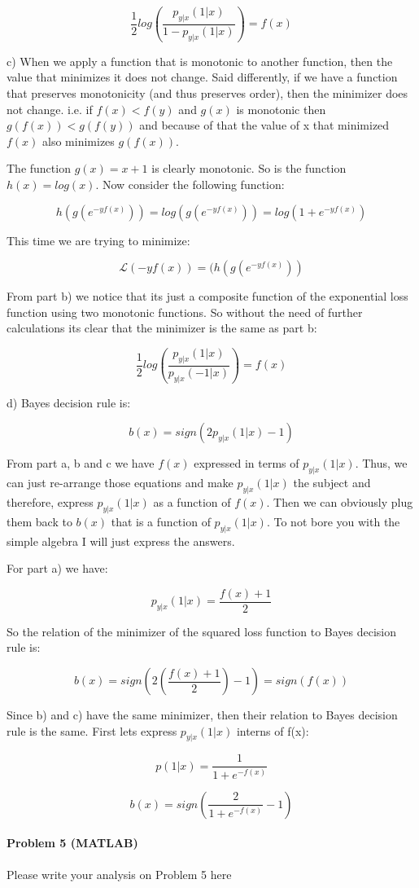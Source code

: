 \documentclass[12pt]{report}
\begin{document}
$$\frac{1}{2}log\left( \frac{p_{y|x}(1|x)}{1 - p_{y|x}(1|x)} \right) = f(x)$$

c) When we apply a function that is monotonic to another function, then the value that minimizes it does not change. Said differently, if we have a function that preserves monotonicity (and thus preserves order), then the minimizer does not change. i.e. if $f(x) < f(y)$ and $g(x)$ is monotonic then $ g( f(x) ) < g( f(y) )$ and because of that the value of x that minimized $f(x)$ also minimizes $g(f(x))$.

The function $g(x) = x + 1$ is clearly monotonic. So is the function $h(x) = log(x)$. Now consider the following function:

$$h(g(e^{-yf(x)})) = log(g( e^{-yf(x)} )) = log(1 + e^{-yf(x)})$$

This time we are trying to minimize:

$$\mathcal{L}(-yf(x)) = (h(g(e^{-yf(x)}))$$

From part b) we notice that its just a composite function of the exponential loss function using two monotonic functions. So without the need of further calculations its clear that the minimizer is the same as part b:

$$\frac{1}{2}log\left( \frac{p_{y|x}(1|x)}{p_{y|x}(-1|x)} \right) = f(x)$$

d) Bayes decision rule is:

$$ b(x) = sign(2p_{y|x}(1|x) -1)$$

From part a, b and c we have $f(x)$ expressed in terms of $p_{y|x}(1|x)$. Thus, we can just re-arrange those equations and make $p_{y|x}(1|x)$ the subject and therefore, express $p_{y|x}(1|x)$ as a function of $f(x)$. Then we can obviously plug them back to $b(x)$ that is a function of $p_{y|x}(1|x)$. To not bore you with the simple algebra I will just express the answers.

For part a) we have:

$$p_{y|x}(1|x) = \frac{f(x) + 1}{2}$$

So the relation of the minimizer of the squared loss function to Bayes decision rule is:

$$b(x) = sign(2\left( \frac{f(x) + 1}{2} \right) -1 ) = sign(f(x)) $$

Since b) and c) have the same minimizer, then their relation to Bayes decision rule is the same. First lets express $p_{y|x}(1|x)$ interns of f(x):

$$p(1|x) = \frac{1}{1+e^{-f(x)} }$$

$$ b(x) = sign \left( \frac{2}{1+e^{-f(x)}}   - 1 \right)$$

\paragraph{Problem 5 (MATLAB)}
Please write your analysis on Problem 5 here
\end{document}
